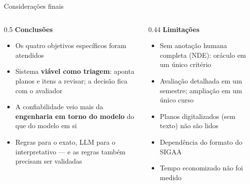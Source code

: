 \documentclass[aspectratio=169,11pt,xcolor=table]{beamer}
\begin{document}

\begin{frame}{Considerações finais}
  \begin{columns}[T]
    \begin{column}{0.5\textwidth}
      {\bfseries\large Conclusões}\par\medskip
      \begin{itemize}\small\setlength\itemsep{0.5em}
        \item Os quatro objetivos específicos foram atendidos
        \item Sistema \textbf{viável como triagem}: aponta planos e itens a revisar;
              a decisão fica com o avaliador
        \item A confiabilidade veio mais da \textbf{engenharia em torno do modelo}
              do que do modelo em si
        \item Regras para o exato, LLM para o interpretativo --- e as regras também
              precisam ser validadas
      \end{itemize}
    \end{column}
    \begin{column}{0.44\textwidth}
      {\bfseries\large Limitações}\par\medskip
      \begin{itemize}\small\setlength\itemsep{0.5em}
        \item Sem anotação humana completa (NDE): oráculo em um único critério
        \item Avaliação detalhada em um semestre; ampliação em um único curso
        \item Planos digitalizados (sem texto) não são lidos
        \item Dependência do formato do SIGAA
        \item Tempo economizado não foi medido
      \end{itemize}
    \end{column}
  \end{columns}
\end{frame}
\end{document}
